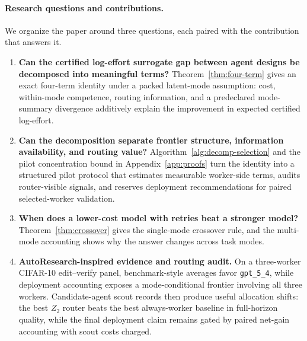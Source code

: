 \documentclass{article}
\begin{document}
\paragraph{Research questions and contributions.}
We organize the paper around three questions, each paired with the contribution that answers it.

\begin{enumerate}[leftmargin=1.4em,itemsep=0.15em]
  \item \textbf{Can the certified log-effort surrogate gap between agent designs be decomposed into meaningful terms?}
  Theorem~\ref{thm:four-term} gives an exact four-term identity under a packed latent-mode assumption: cost, within-mode competence, routing information, and a predeclared mode-summary divergence additively explain the improvement in expected certified log-effort.
  \item \textbf{Can the decomposition separate frontier structure, information availability, and routing value?}
  Algorithm~\ref{alg:decomp-selection} and the pilot concentration bound in Appendix~\ref{app:proofs} turn the identity into a structured pilot protocol that estimates measurable worker-side terms, audits router-visible signals, and reserves deployment recommendations for paired selected-worker validation.
  \item \textbf{When does a lower-cost model with retries beat a stronger model?}
  Theorem~\ref{thm:crossover} gives the single-mode crossover rule, and the multi-mode accounting shows why the answer changes across task modes.
  \item \textbf{AutoResearch-inspired evidence and routing audit.}
    On a three-worker CIFAR-10 edit--verify panel, benchmark-style averages favor
    \texttt{gpt\_5\_4}, while deployment accounting exposes a mode-conditional
    frontier involving all three workers.
    Candidate-agent scout records then produce useful allocation shifts: the best
    \(Z_2\) router beats the best always-worker baseline in full-horizon quality,
    while the final deployment claim remains gated by paired net-gain accounting
    with scout costs charged.
\end{enumerate}
\end{document}
